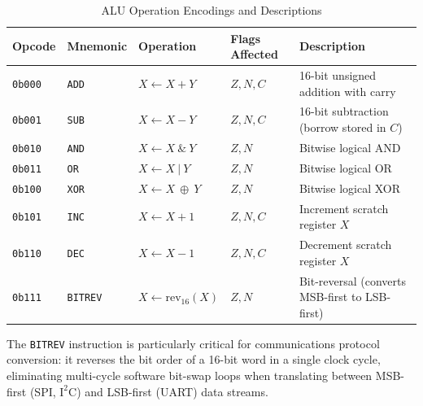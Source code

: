 \documentclass[11pt,a4paper]{article}
\begin{document}
\begin{table}[htbp]
\centering
\caption{ALU Operation Encodings and Descriptions}
\label{tab:alu_ops}
\begin{tabularx}{\textwidth}{llllX}
\toprule
\textbf{Opcode} & \textbf{Mnemonic} & \textbf{Operation} & \textbf{Flags Affected} & \textbf{Description} \\
\midrule
\texttt{0b000} & \texttt{ADD} & $X \leftarrow X + Y$ & $Z, N, C$ & 16-bit unsigned addition with carry \\
\texttt{0b001} & \texttt{SUB} & $X \leftarrow X - Y$ & $Z, N, C$ & 16-bit subtraction (borrow stored in $C$) \\
\texttt{0b010} & \texttt{AND} & $X \leftarrow X \ \&\ Y$ & $Z, N$ & Bitwise logical AND \\
\texttt{0b011} & \texttt{OR}  & $X \leftarrow X \ |\ Y$ & $Z, N$ & Bitwise logical OR \\
\texttt{0b100} & \texttt{XOR} & $X \leftarrow X \ \oplus\ Y$ & $Z, N$ & Bitwise logical XOR \\
\texttt{0b101} & \texttt{INC} & $X \leftarrow X + 1$ & $Z, N, C$ & Increment scratch register $X$ \\
\texttt{0b110} & \texttt{DEC} & $X \leftarrow X - 1$ & $Z, N, C$ & Decrement scratch register $X$ \\
\texttt{0b111} & \texttt{BITREV} & $X \leftarrow \text{rev}_{16}(X)$ & $Z, N$ & Bit-reversal (converts MSB-first to LSB-first) \\
\bottomrule
\end{tabularx}
\end{table}

The \texttt{BITREV} instruction is particularly critical for communications protocol conversion: it reverses the bit order of a 16-bit word in a single clock cycle, eliminating multi-cycle software bit-swap loops when translating between MSB-first (SPI, $\text{I}^2\text{C}$) and LSB-first (UART) data streams.
\end{document}
